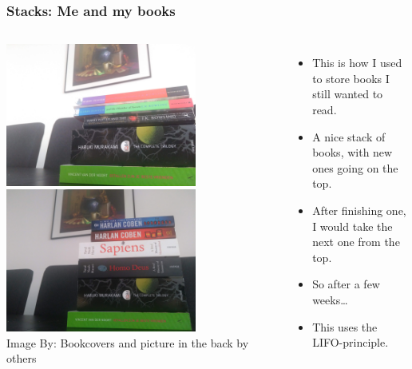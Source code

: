 \begin{frame}
	\frametitle{Stacks: Me and my books}

	\begin{columns}[T]
			\begin{center}

					\includegraphics[width=0.7\textwidth]{images/stack_read.jpg}\\

					\includegraphics[width=0.7\textwidth]{images/stack_unread.jpg}\\

{\scriptsize Image By:}
{\scriptsize Bookcovers and picture in the back by others}
			\end{center}
		\begin{itemize}
			\item This is how I used to store books I still wanted to read.
			\item A nice \alert{stack} of books, with new ones going on the top.
			\item After finishing one, I would take the next one from the top.
			\item So after a few weeks\dots
			\item This uses the \alert{LIFO}-principle.
		\end{itemize}
	\end{columns}
\end{frame}

